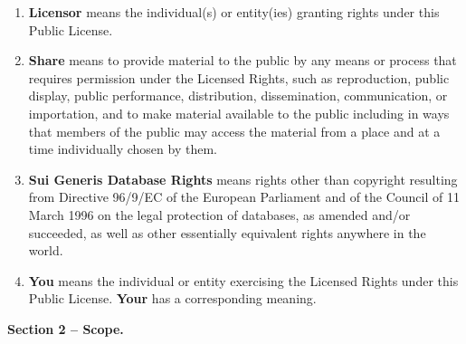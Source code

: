 \begin{enumerate}
\item \textbf{Licensor} means the individual(s) or entity(ies) granting rights under this Public License.
\item \textbf{Share} means to provide material to the public by any means or process that requires permission under the Licensed Rights, such as reproduction, public display, public performance, distribution, dissemination, communication, or importation, and to make material available to the public including in ways that members of the public may access the material from a place and at a time individually chosen by them.
\item \textbf{Sui Generis Database Rights} means rights other than copyright resulting from Directive 96/9/EC of the European Parliament and of the Council of 11 March 1996 on the legal protection of databases, as amended and/or succeeded, as well as other essentially equivalent rights anywhere in the world.
\item \textbf{You} means the individual or entity exercising the Licensed Rights under this Public License. \textbf{Your} has a corresponding meaning.
\end{enumerate}
\par \textbf{Section 2 – Scope.}

